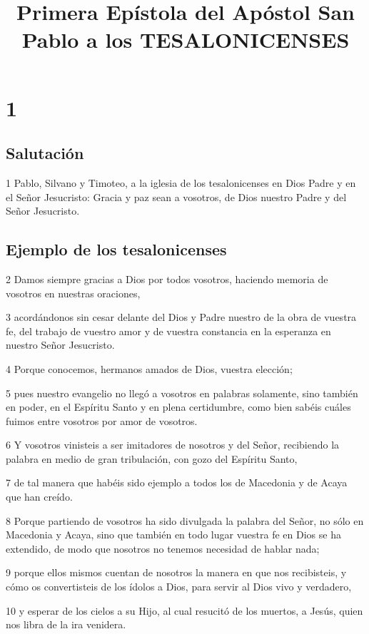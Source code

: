 
\title{Primera Epístola del Apóstol San Pablo a los TESALONICENSES}

\chapter{1}

\section*{Salutación}

\par 1 Pablo, Silvano y Timoteo, a la iglesia de los tesalonicenses en Dios Padre y en el Señor Jesucristo: Gracia y paz sean a vosotros, de Dios nuestro Padre y del Señor Jesucristo.

\section*{Ejemplo de los tesalonicenses}

\par 2 Damos siempre gracias a Dios por todos vosotros, haciendo memoria de vosotros en nuestras oraciones,
\par 3 acordándonos sin cesar delante del Dios y Padre nuestro de la obra de vuestra fe, del trabajo de vuestro amor y de vuestra constancia en la esperanza en nuestro Señor Jesucristo.
\par 4 Porque conocemos, hermanos amados de Dios, vuestra elección;
\par 5 pues nuestro evangelio no llegó a vosotros en palabras solamente, sino también en poder, en el Espíritu Santo y en plena certidumbre, como bien sabéis cuáles fuimos entre vosotros por amor de vosotros.
\par 6 Y vosotros vinisteis a ser imitadores de nosotros y del Señor, recibiendo la palabra en medio de gran tribulación, con gozo del Espíritu Santo,
\par 7 de tal manera que habéis sido ejemplo a todos los de Macedonia y de Acaya que han creído.
\par 8 Porque partiendo de vosotros ha sido divulgada la palabra del Señor, no sólo en Macedonia y Acaya, sino que también en todo lugar vuestra fe en Dios se ha extendido, de modo que nosotros no tenemos necesidad de hablar nada;
\par 9 porque ellos mismos cuentan de nosotros la manera en que nos recibisteis, y cómo os convertisteis de los ídolos a Dios, para servir al Dios vivo y verdadero,
\par 10 y esperar de los cielos a su Hijo, al cual resucitó de los muertos, a Jesús, quien nos libra de la ira venidera.

